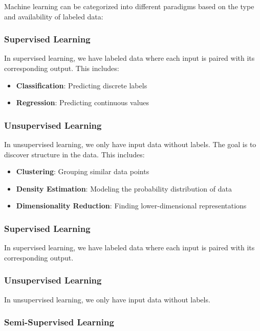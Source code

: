\documentclass[11pt,a4paper]{article}
\theoremstyle{definition}
\theoremstyle{plain}
\theoremstyle{remark}
\begin{document}
\begin{tcolorbox}[colback=purple!5!white,colframe=purple!75!black,title=\textbf{Three Learning Paradigms}]
Machine learning can be categorized into different paradigms based on the type and availability of labeled data:

\subsubsection*{Supervised Learning}
In supervised learning, we have labeled data where each input is paired with its corresponding output. This includes:
\begin{itemize}
    \item \textbf{Classification}: Predicting discrete labels
    \item \textbf{Regression}: Predicting continuous values
\end{itemize}

\subsubsection*{Unsupervised Learning}
In unsupervised learning, we only have input data without labels. The goal is to discover structure in the data. This includes:
\begin{itemize}
    \item \textbf{Clustering}: Grouping similar data points
    \item \textbf{Density Estimation}: Modeling the probability distribution of data
    \item \textbf{Dimensionality Reduction}: Finding lower-dimensional representations
\end{itemize}
\end{tcolorbox}

\subsubsection{Supervised Learning}

In supervised learning, we have labeled data where each input is paired with its corresponding output.

\subsubsection{Unsupervised Learning}

In unsupervised learning, we only have input data without labels.

\subsubsection{Semi-Supervised Learning}
\end{document}
